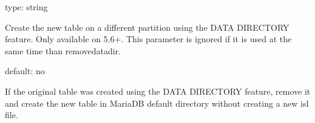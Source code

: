 \documentclass[letterpaper,10pt,english]{sphinxmanual}
\begin{document}
\begin{fulllineitems}
\label{\detokenize{mariadb-schema-change:cmdoption-mariadb-schema-change-data-dir}}
\sphinxAtStartPar
type: string

\sphinxAtStartPar
Create the new table on a different partition using the DATA DIRECTORY feature.
Only available on 5.6+. This parameter is ignored if it is used at the same time
than remove\sphinxhyphen{}data\sphinxhyphen{}dir.

\end{fulllineitems}


\begin{fulllineitems}
\label{\detokenize{mariadb-schema-change:cmdoption-mariadb-schema-change-remove-data-dir}}
\sphinxAtStartPar
default: no

\sphinxAtStartPar
If the original table was created using the DATA DIRECTORY feature, remove it and create
the new table in MariaDB default directory without creating a new isl file.

\end{fulllineitems}

\end{document}
